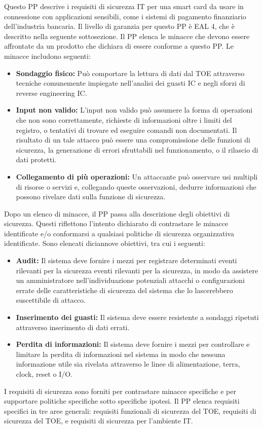 Questo PP descrive i requisiti di sicurezza IT per una smart card da usare in connessione con applicazioni sensibili, come i sistemi di pagamento finanziario dell'industria bancaria. Il livello di garanzia per questo PP è EAL 4, che è descritto nella seguente sottosezione. Il PP elenca le minacce che devono essere affrontate da un prodotto che dichiara di essere conforme a questo PP. Le minacce includono seguenti:
\begin{itemize}
    \item \textbf{Sondaggio fisico:} Può comportare la lettura di dati dal TOE attraverso tecniche comunemente impiegate nell'analisi dei guasti IC e negli sforzi di reverse engineering IC.
    
    \item \textbf{Input non valido:} L'input non valido può assumere la forma di operazioni che non sono correttamente, richieste di informazioni oltre i limiti del registro, o tentativi di trovare ed eseguire comandi non documentati. Il risultato di un tale attacco può essere una compromissione delle funzioni di sicurezza, la generazione di errori sfruttabili nel funzionamento, o il rilascio di dati protetti.
    
    \item \textbf{Collegamento di più operazioni:} Un attaccante può osservare usi multipli di risorse o servizi e, collegando queste osservazioni, dedurre informazioni che possono rivelare dati sulla funzione di sicurezza.


\end{itemize}
Dopo un elenco di minacce, il PP passa alla descrizione degli obiettivi di sicurezza. Questi riflettono l'intento dichiarato di contrastare le minacce identificate e/o conformarsi a qualsiasi politiche di sicurezza organizzativa identificate. Sono elencati diciannove obiettivi, tra cui i seguenti:
\begin{itemize}
    \item \textbf{Audit:} Il sistema deve fornire i mezzi per registrare determinati eventi rilevanti per la sicurezza eventi rilevanti per la sicurezza, in modo da assistere un amministratore nell'individuazione potenziali attacchi o configurazioni errate delle caratteristiche di sicurezza del sistema che lo lascerebbero suscettibile di attacco.
    
    \item \textbf{Inserimento dei guasti:} Il sistema deve essere resistente a sondaggi ripetuti attraverso inserimento di dati errati.
    
    \item \textbf{Perdita di informazioni:} Il sistema deve fornire i mezzi per controllare e limitare la perdita di informazioni nel sistema in modo che nessuna informazione utile sia rivelata attraverso le linee di alimentazione, terra, clock, reset o I/O.
\end{itemize}
I requisiti di sicurezza sono forniti per contrastare minacce specifiche e per supportare politiche specifiche sotto specifiche ipotesi. Il PP elenca requisiti specifici in tre aree generali: requisiti funzionali di sicurezza del TOE, requisiti di sicurezza del TOE, e requisiti di sicurezza per l'ambiente IT.

